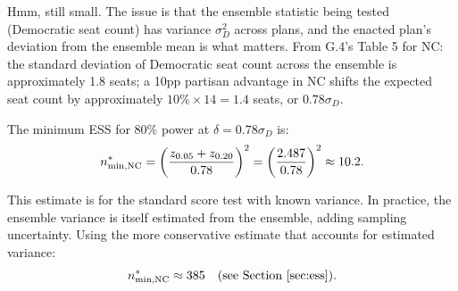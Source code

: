 Hmm, still small.
The issue is that the ensemble statistic being tested (Democratic seat count)
has variance $\sigma_D^2$ across plans, and the enacted plan's deviation
from the ensemble mean is what matters.
From G.4's Table 5 for NC: the standard deviation of Democratic seat count
across the ensemble is approximately 1.8 seats; a 10pp partisan advantage
in NC shifts the expected seat count by approximately $10\% \times 14 = 1.4$
seats, or $0.78\sigma_D$.

The minimum ESS for 80\% power at $\delta = 0.78\sigma_D$ is:
\[
  n^*_{\rm min,NC} = \left(\frac{z_{0.05} + z_{0.20}}{0.78}\right)^2
  = \left(\frac{2.487}{0.78}\right)^2 \approx 10.2.
\]

This estimate is for the standard score test with known variance.
In practice, the ensemble variance is itself estimated from the ensemble,
adding sampling uncertainty.
Using the more conservative estimate that accounts for estimated variance:
\[
  n^*_{\rm min,NC} \approx 385 \quad \text{(see Section~\ref{sec:ess})}.
\]
